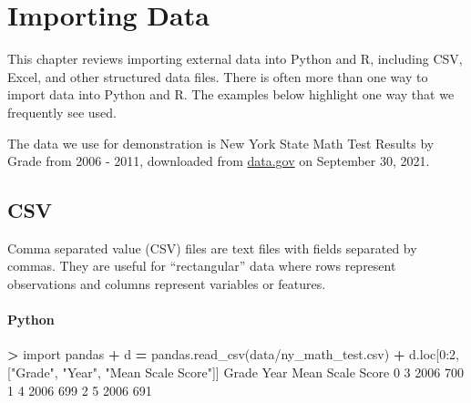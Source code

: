 \documentclass[
]{book}
\newenvironment{Shaded}{\begin{snugshade}}{\end{snugshade}}
\newcommand{\DecValTok}[1]{\textcolor[rgb]{0.00,0.00,0.81}{#1}}
\newcommand{\ImportTok}[1]{#1}
\newcommand{\NormalTok}[1]{#1}
\newcommand{\OperatorTok}[1]{\textcolor[rgb]{0.81,0.36,0.00}{\textbf{#1}}}
\newcommand{\StringTok}[1]{\textcolor[rgb]{0.31,0.60,0.02}{#1}}
\begin{document}
\hypertarget{importing-data}{%
\chapter{Importing Data}\label{importing-data}}

This chapter reviews importing external data into Python and R, including CSV, Excel, and other structured data files. There is often more than one way to import data into Python and R. The examples below highlight one way that we frequently see used.

The data we use for demonstration is New York State Math Test Results by Grade from 2006 - 2011, downloaded from \href{https://catalog.data.gov/dataset/2006-2011-nys-math-test-results-by-grade-citywide-by-race-ethnicity}{data.gov} on September 30, 2021.

\hypertarget{csv}{%
\section{CSV}\label{csv}}

Comma separated value (CSV) files are text files with fields separated by commas. They are useful for ``rectangular'' data where rows represent observations and columns represent variables or features.

\hypertarget{python-10}{%
\subsubsection*{Python}\label{python-10}}

\begin{Shaded}
\begin{Highlighting}[]
\OperatorTok{\textgreater{}} \ImportTok{import}\NormalTok{ pandas}
\OperatorTok{+}\NormalTok{ d }\OperatorTok{=}\NormalTok{ pandas.read\_csv(}\StringTok{\textquotesingle{}data/ny\_math\_test.csv\textquotesingle{}}\NormalTok{)}
\OperatorTok{+}\NormalTok{ d.loc[}\DecValTok{0}\NormalTok{:}\DecValTok{2}\NormalTok{, [}\StringTok{"Grade"}\NormalTok{, }\StringTok{"Year"}\NormalTok{, }\StringTok{"Mean Scale Score"}\NormalTok{]]}
\NormalTok{  Grade  Year  Mean Scale Score}
\DecValTok{0}     \DecValTok{3}  \DecValTok{2006}               \DecValTok{700}
\DecValTok{1}     \DecValTok{4}  \DecValTok{2006}               \DecValTok{699}
\DecValTok{2}     \DecValTok{5}  \DecValTok{2006}               \DecValTok{691}
\end{Highlighting}
\end{Shaded}
\end{document}
